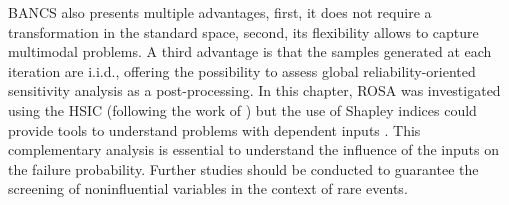 BANCS also presents multiple advantages, first, it does not require a transformation in the standard space, second, its flexibility allows to capture multimodal problems. 
A third advantage is that the samples generated at each iteration are i.i.d., offering the possibility to assess global reliability-oriented sensitivity analysis as a post-processing. 
In this chapter, ROSA was investigated using the HSIC (following the work of \citealp{marrel_chabridon_2021}) but the use of Shapley indices could provide tools to understand problems with dependent inputs \citep{ilidrissi_2021_rosa}.
This complementary analysis is essential to understand the influence of the inputs on the failure probability. 
Further studies should be conducted to guarantee the screening of noninfluential variables in the context of rare events. 


%    
